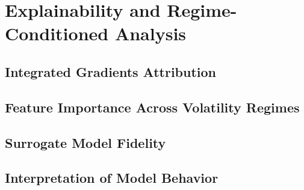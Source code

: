 
\section{Explainability and Regime-Conditioned Analysis}

\subsection{Integrated Gradients Attribution}

\subsection{Feature Importance Across Volatility Regimes}

\subsection{Surrogate Model Fidelity}

\subsection{Interpretation of Model Behavior}